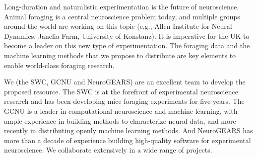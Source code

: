 
Long-duration and naturalistic experimentation is the future of neuroscience.
Animal foraging is a central neuroscience problem today, and multiple groups
around the world are working on this topic (e.g., Allen Institute for Neural
Dynamics, Janelia Farm, University of Konstanz). It is imperative for the UK to
become a leader on this new type of experimentation.
%
The foraging data and the machine learning methods that we propose to
distribute are key elements to enable world-class foraging research.

We (the SWC, GCNU and NeuroGEARS) are an excellent team to develop the proposed
resource. The SWC is at the forefront of experimental neuroscience research and
has been developing mice foraging experiments for five years. The GCNU is a
leader in computational neuroscience and machine learning, with ample
experience in building methods to characterize neural data, and more recently
in distributing openly machine learning methods. And NeuroGEARS has more than a
decade of experience building high-quality software for experimental
neuroscience. We collaborate extensively in a wide range of projects.


